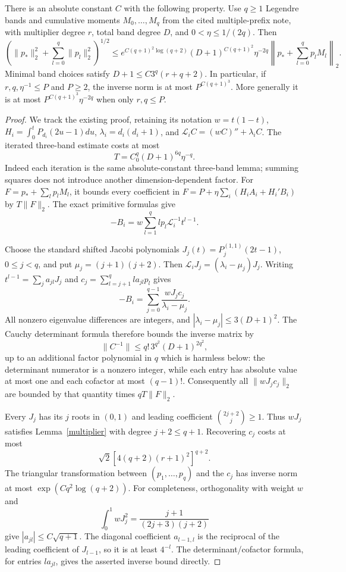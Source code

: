 \documentclass[11pt]{article}
\begin{document}
\begin{theorem}\label{conditioning}
There is an absolute constant $C$ with the following property.
Use $q\ge1$ Legendre bands and cumulative moments $M_0,\ldots,M_q$
from the cited multiple-prefix note, with multiplier degree $r$, total
band degree $D$, and $0<\eta\le1/(2q)$. Then
\[
 \left(\|p_*\|_2^2+\sum_{l=0}^q\|p_l\|_2^2\right)^{1/2}
 \le e^{C(q+1)^2\log(q+2)}
       (D+1)^{C(q+1)^2}\eta^{-2q}
       \left\|p_*+\sum_{l=0}^q p_lM_l\right\|_2.
\]
Minimal band choices satisfy
$D+1\le C3^q(r+q+2)$.
In particular, if $r,q,\eta^{-1}\le P$ and $P\ge2$, the inverse
norm is at most $P^{C(q+1)^3}$. More generally it is at most
$P^{C(q+1)^3}\eta^{-2q}$ when only $r,q\le P$.
\end{theorem}
\begin{proof}
We track the existing proof, retaining its notation
$w=t(1-t)$, $H_i=\int_0^tP_{d_i}(2u-1)du$,
$\lambda_i=d_i(d_i+1)$, and
$\mathcal L_i C=(wC)''+\lambda_iC$.
The iterated three-band estimate costs at most
\[
 T=C_0^q(D+1)^{6q}\eta^{-q}.
\]
Indeed each iteration is the same absolute-constant three-band lemma;
summing squares does not introduce another dimension-dependent factor.
For $F=p_*+\sum_l p_lM_l$, it bounds every coefficient in
$F=P+\eta\sum_i(H_iA_i+H_i'B_i)$ by $T\|F\|_2$.
The exact primitive formulas give
\[
 -B_i=w\sum_{l=1}^q l p_l\mathcal L_i^{-1}t^{l-1}.
\]

Choose the standard shifted Jacobi polynomials
$J_j(t)=P_j^{(1,1)}(2t-1)$, $0\le j<q$, and put
$\mu_j=(j+1)(j+2)$. Then
$\mathcal L_iJ_j=(\lambda_i-\mu_j)J_j$.
Writing $t^{l-1}=\sum_j a_{jl}J_j$ and
$c_j=\sum_{l=j+1}^q l a_{jl}p_l$ gives
\[
 -B_i=\sum_{j=0}^{q-1}\frac{wJ_jc_j}{\lambda_i-\mu_j}.
\]
All nonzero eigenvalue differences are integers, and
$|\lambda_i-\mu_j|\le3(D+1)^2$.
The Cauchy determinant formula therefore bounds the inverse matrix
by
\[
 \|C^{-1}\|\le q!\,3^{q^2}(D+1)^{2q^2},
\]
up to an additional factor polynomial in $q$ which is harmless below:
the determinant numerator is a nonzero integer, while each entry has
absolute value at most one and each cofactor at most $(q-1)!$.
Consequently all $\|wJ_jc_j\|_2$ are bounded by that quantity times
$qT\|F\|_2$.

Every $J_j$ has its $j$ roots in $(0,1)$ and leading coefficient
$\binom{2j+2}{j}\ge1$. Thus $wJ_j$ satisfies
Lemma~\ref{multiplier} with degree $j+2\le q+1$.
Recovering $c_j$ costs at most
\[
 \sqrt2[4(q+2)(r+1)^2]^{q+2}.
\]
The triangular transformation between $(p_1,\ldots,p_q)$ and the
$c_j$ has inverse norm at most $\exp(Cq^2\log(q+2))$.
For completeness, orthogonality with weight $w$ and
\[
 \int_0^1 wJ_j^2=\frac{j+1}{(2j+3)(j+2)}
\]
give $|a_{jl}|\le C\sqrt{q+1}$. The diagonal coefficient
$a_{l-1,l}$ is the reciprocal of the leading coefficient of $J_{l-1}$,
so it is at least $4^{-l}$. The determinant/cofactor formula, for
entries $l a_{jl}$, gives the asserted inverse bound directly.


\end{proof}
\end{document}
